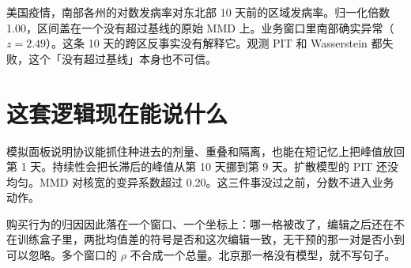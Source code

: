 \documentclass[11pt]{article}
\begin{document}
美国疫情，南部各州的对数发病率对东北部 10 天前的区域发病率。归一化倍数 1.00，区间盖在一个没有超过基线的原始 MMD 上。业务窗口里南部确实异常（\(z=2.49\)）。这条 10 天的跨区反事实没有解释它。观测 PIT 和 Wasserstein 都失败，这个「没有超过基线」本身也不可信。

\section{这套逻辑现在能说什么}

模拟面板说明协议能抓住种进去的剂量、重叠和隔离，也能在短记忆上把峰值放回第 1 天。持续性会把长滞后的峰值从第 10 天挪到第 9 天。扩散模型的 PIT 还没均匀。MMD 对核宽的变异系数超过 0.20。这三件事没过之前，分数不进入业务动作。

购买行为的归因因此落在一个窗口、一个坐标上：哪一格被改了，编辑之后还在不在训练盒子里，两批均值差的符号是否和这次编辑一致，无干预的那一对是否小到可以忽略。多个窗口的 \(\rho\) 不合成一个总量。北京那一格没有模型，就不写句子。
\end{document}
